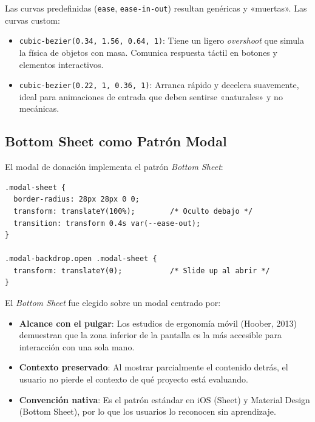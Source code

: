 \documentclass[12pt, a4paper]{article}
\begin{document}
\begin{justificacionbox}
Las curvas predefinidas (\texttt{ease}, \texttt{ease-in-out}) resultan genéricas y «muertas». Las curvas custom:
\begin{itemize}
  \item \texttt{cubic-bezier(0.34, 1.56, 0.64, 1)}: Tiene un ligero \textit{overshoot} que simula la física de objetos con masa. Comunica respuesta táctil en botones y elementos interactivos.
  \item \texttt{cubic-bezier(0.22, 1, 0.36, 1)}: Arranca rápido y decelera suavemente, ideal para animaciones de entrada que deben sentirse «naturales» y no mecánicas.
\end{itemize}
\end{justificacionbox}

\subsection{Bottom Sheet como Patrón Modal}

El modal de donación implementa el patrón \textit{Bottom Sheet}:

\begin{lstlisting}[style=css, caption={Bottom Sheet: técnica CSS}]
.modal-sheet {
  border-radius: 28px 28px 0 0;
  transform: translateY(100%);        /* Oculto debajo */
  transition: transform 0.4s var(--ease-out);
}

.modal-backdrop.open .modal-sheet {
  transform: translateY(0);           /* Slide up al abrir */
}
\end{lstlisting}

\begin{justificacionbox}
El \textit{Bottom Sheet} fue elegido sobre un modal centrado por:
\begin{itemize}
  \item \textbf{Alcance con el pulgar}: Los estudios de ergonomía móvil (Hoober, 2013) demuestran que la zona inferior de la pantalla es la más accesible para interacción con una sola mano.
  \item \textbf{Contexto preservado}: Al mostrar parcialmente el contenido detrás, el usuario no pierde el contexto de qué proyecto está evaluando.
  \item \textbf{Convención nativa}: Es el patrón estándar en iOS (Sheet) y Material Design (Bottom Sheet), por lo que los usuarios lo reconocen sin aprendizaje.
\end{itemize}
\end{justificacionbox}
\end{document}
